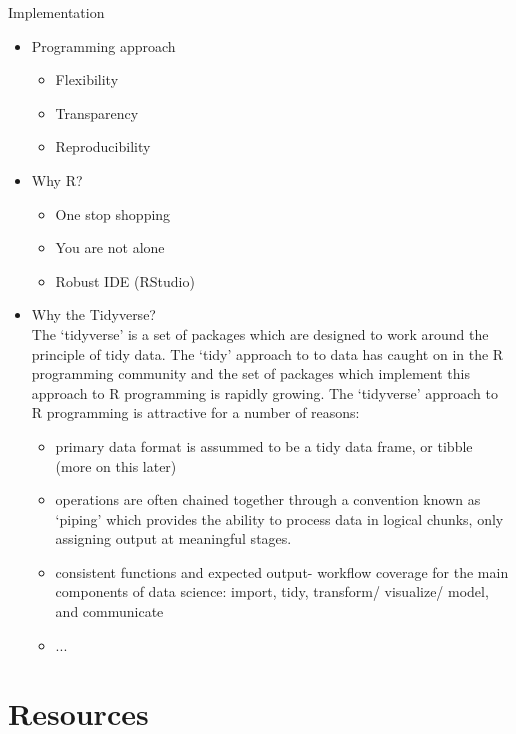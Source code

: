 \documentclass[
  letterpaper,
]{latex/krantz}
\begin{document}
Implementation

\begin{itemize}
\item
  Programming approach

  \begin{itemize}
  \item
    Flexibility
  \item
    Transparency
  \item
    Reproducibility
  \end{itemize}
\item
  Why R?

  \begin{itemize}
  \item
    One stop shopping
  \item
    You are not alone
  \item
    Robust IDE (RStudio)
  \end{itemize}
\item
  Why the Tidyverse?\\
  The `tidyverse' is a set of packages which are designed to work around
  the principle of tidy data. The `tidy' approach to to data has caught
  on in the R programming community and the set of packages which
  implement this approach to R programming is rapidly growing. The
  `tidyverse' approach to R programming is attractive for a number of
  reasons:

  \begin{itemize}
  \item
    primary data format is assummed to be a tidy data frame, or tibble
    (more on this later)
  \item
    operations are often chained together through a convention known as
    `piping' which provides the ability to process data in logical
    chunks, only assigning output at meaningful stages.
  \item
    consistent functions and expected output- workflow coverage for the
    main components of data science: import, tidy, transform/ visualize/
    model, and communicate
  \item
    ...
  \end{itemize}
\end{itemize}

\hypertarget{resources}{%
\section*{Resources}\label{resources}}
\end{document}
